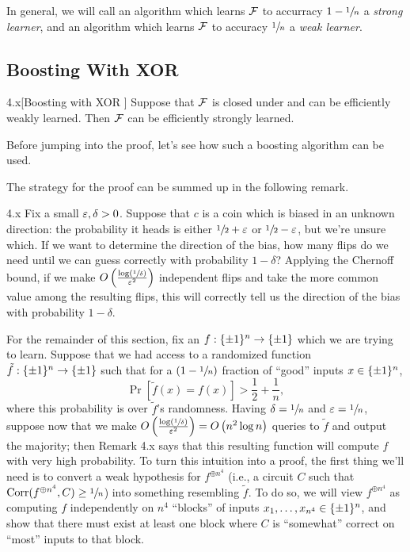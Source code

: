 \documentclass[11pt]{article}
\begin{document}
In general, we will call an algorithm which learns $\mathcal{F}$ to accurracy $1 - \sfrac{1}{n}$ a \emph{strong learner}, and an algorithm which learns $\mathcal{F}$ to accuracy $\sfrac{1}{n}$ a \emph{weak learner}.



\subsection{Boosting With XOR}





\begin{theorem}{4.x}[Boosting with XOR \cite{BonehLipton}]
    Suppose that $\mathcal{F}$ is closed under \XOR{} and can be efficiently weakly learned. Then $\mathcal{F}$ can be efficiently strongly learned.
\end{theorem}

Before jumping into the proof, let's see how such a boosting algorithm can be used. 

The strategy for the proof can be summed up in the following remark.

\begin{remark}{4.x}
    Fix a small $\varepsilon, \delta > 0$. Suppose that $c$ is a coin which is biased in an unknown direction: the probability it heads is either $\sfrac{1}{2} + \varepsilon$ or $\sfrac{1}{2} - \varepsilon$, but we're unsure which. If we want to determine the direction of the bias, how many flips do we need until we can guess correctly with probability $1 - \delta$? Applying the Chernoff bound, if we make $O\left(\frac{\log \left(\sfrac{1}{\delta}\right)}{\varepsilon^2}\right)$ independent flips and take the more common value among the resulting flips, this will correctly tell us the direction of the bias with probability $1 - \delta$.
\end{remark}

For the remainder of this section, fix an $f : \{\pm 1\}^n \rightarrow \{\pm 1\}$ which we are trying to learn. Suppose that we had access to a randomized function $\tilde{f} : \{\pm 1\}^n \rightarrow \{\pm 1\}$ such that for a $(1 - \sfrac{1}{n})$ fraction of ``good'' inputs $x \in \{\pm 1\}^n$, 
\begin{equation*}
    \Pr[\tilde{f}(x) = f(x)] > \frac{1}{2} + \frac{1}{n},
\end{equation*}
where this probability is over $\tilde{f}$'s randomness. Having $\delta = \sfrac{1}{n}$ and $\varepsilon = \sfrac{1}{n}$, suppose now that we make $O\left(\frac{\log (\sfrac{1}{\delta})}{\varepsilon^2}\right) = O\left(n^2 \log n\right)$ queries to $\tilde{f}$ and output the majority; then Remark 4.x says that this resulting function will compute $f$ with very high probability. To turn this intuition into a proof, the first thing we'll need is to convert a weak hypothesis for $f^{\oplus n^4}$ (i.e., a circuit $C$ such that $\mathrm{Corr}(f^{\oplus n^4}, C) \geq \sfrac{1}{n}$) into something resembling $\tilde{f}$. To do so, we will view $f^{\oplus n^4}$ as computing $f$ independently on $n^4$ ``blocks'' of inputs $x_1, \ldots, x_{n^4} \in \{\pm 1\}^n$, and show that there must exist at least one block where $C$ is ``somewhat'' correct on ``most'' inputs to that block.
\end{document}
